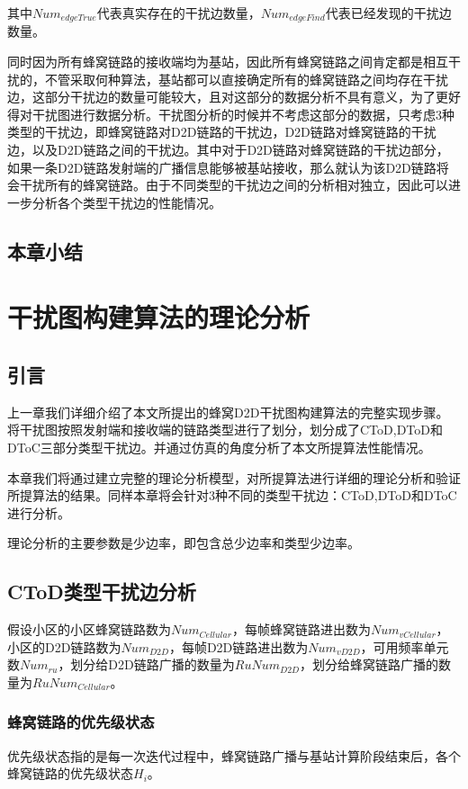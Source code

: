 \documentclass[figurelist,tablelist,algorithmlist,nomlist,masters]{seuthesix}
\begin{document}
	其中$Nu{m_{edgeTrue}}$代表真实存在的干扰边数量，$Nu{m_{edgeFind}}$代表已经发现的干扰边数量。
	
	同时因为所有蜂窝链路的接收端均为基站，因此所有蜂窝链路之间肯定都是相互干扰的，不管采取何种算法，基站都可以直接确定所有的蜂窝链路之间均存在干扰边，这部分干扰边的数量可能较大，且对这部分的数据分析不具有意义，为了更好得对干扰图进行数据分析。干扰图分析的时候并不考虑这部分的数据，只考虑3种类型的干扰边，即蜂窝链路对D2D链路的干扰边，D2D链路对蜂窝链路的干扰边，以及D2D链路之间的干扰边。其中对于D2D链路对蜂窝链路的干扰边部分，如果一条D2D链路发射端的广播信息能够被基站接收，那么就认为该D2D链路将会干扰所有的蜂窝链路。由于不同类型的干扰边之间的分析相对独立，因此可以进一步分析各个类型干扰边的性能情况。

	\section{本章小结}


	\chapter{干扰图构建算法的理论分析}
	\section{引言}
	上一章我们详细介绍了本文所提出的蜂窝D2D干扰图构建算法的完整实现步骤。将干扰图按照发射端和接收端的链路类型进行了划分，划分成了CToD,DToD和DToC三部分类型干扰边。并通过仿真的角度分析了本文所提算法性能情况。
	
	本章我们将通过建立完整的理论分析模型，对所提算法进行详细的理论分析和验证所提算法的结果。同样本章将会针对3种不同的类型干扰边：CToD,DToD和DToC进行分析。
	
	理论分析的主要参数是少边率，即包含总少边率和类型少边率。
	
	\section{CToD类型干扰边分析}
	假设小区的小区蜂窝链路数为$Nu{m_{Cellular}}$，每帧蜂窝链路进出数为$Nu{m_{vCellular}}$，小区的D2D链路数为$Nu{m_{D2D}}$，每帧D2D链路进出数为$Nu{m_{vD2D}}$，可用频率单元数$Nu{m_{ru}}$，划分给D2D链路广播的数量为$RuNu{m_{D2D}}$，划分给蜂窝链路广播的数量为$RuNu{m_{Cellular}}$。
	
	\subsection{蜂窝链路的优先级状态}
	优先级状态指的是每一次迭代过程中，蜂窝链路广播与基站计算阶段结束后，各个蜂窝链路的优先级状态${H_i}$。
	
\end{document}
